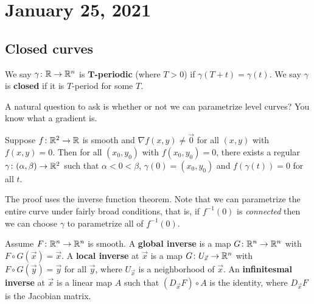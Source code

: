 \section{January 25, 2021}
\subsection{Closed curves}
\begin{definition}[]
    We say $\gamma  \colon \mathbb{R} \to \mathbb{R}^n $ is $\mathbf T$\textbf{-periodic} (where $T>0$) if $\gamma (T+t)=\gamma (t)$. We say $\gamma $ is \textbf{closed} if it is $T$-period for some $T$.
\end{definition}
A natural question to ask is whether or not we can parametrize level curves? You know what a gradient is.
\begin{theorem}
    Suppose $f\colon \mathbb{R}^2 \to \mathbb{R}$ is smooth and $\nabla f(x,y)\neq \vec 0$ for all $(x,y)$ with $f(x,y)=0$. Then for all $(x_0,y_0)$ with $f(x_0,y_0)=0$, there exists a regular $\gamma  \colon (\alpha ,\beta ) \to \mathbb{R}^2$ such that $\alpha <0<\beta $, $\gamma (0)=(x_0,y_0)$ and $f(\gamma (t))=0$ for all $t$.
\end{theorem}
\begin{note}
    The proof uses the inverse function theorem. Note that we can parametrize the entire curve under fairly broad conditions, that is, if $f ^{-1} (0)$ is \emph{connected} then we can choose $\gamma $ to parametrize all of $f^{-1} (0)$.
\end{note}
Assume $F \colon \mathbb{R}^n  \to \mathbb{R}^n $ is smooth. A \textbf{global inverse} is a map $G \colon \mathbb{R}^n  \to \mathbb{R}^n $ with $F \circ G(\vec x)=\vec x$. A \textbf{local inverse} at $\vec x$ is a map $G \colon U_{\vec x} \to \mathbb{R}^n $ with $F \circ G(\vec y)=\vec y$ for all $\vec y$, where $U_{\vec x}$ is a neighborhood of $\vec x$. An \textbf{infinitesmal inverse} at $\vec x$ is a linear map $A $ such that $(D_{\vec x}F) \circ A$ is the identity, where $D_{\vec x}F$ is the Jacobian matrix.

